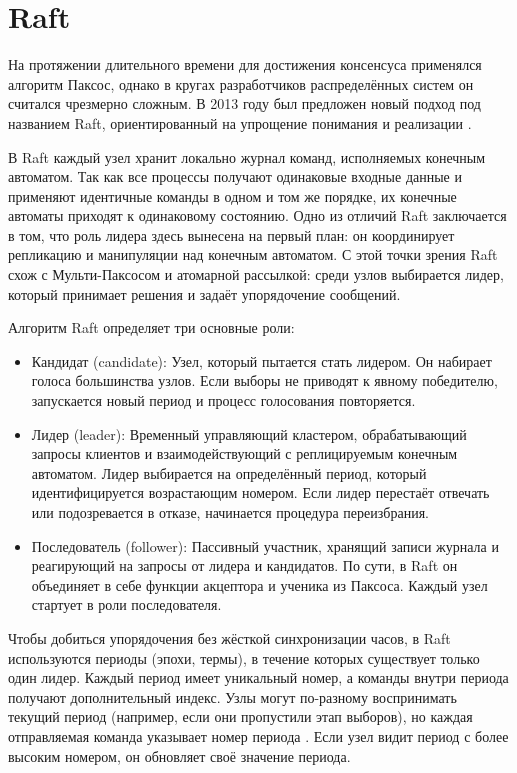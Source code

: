 \section{Raft}

На протяжении длительного времени для достижения консенсуса применялся алгоритм
Паксос, однако в кругах разработчиков распределённых систем он считался
чрезмерно сложным. В 2013 году был предложен новый подход под названием Raft,
ориентированный на упрощение понимания и реализации \cite{ongario14}.

В Raft каждый узел хранит локально журнал команд, исполняемых конечным автоматом.
Так как все процессы получают одинаковые входные данные и применяют идентичные
команды в одном и том же порядке, их конечные автоматы приходят к одинаковому
состоянию. Одно из отличий Raft заключается в том, что роль лидера здесь
вынесена на первый план: он координирует репликацию и манипуляции над конечным
автоматом. С этой точки зрения Raft схож с Мульти-Паксосом и атомарной рассылкой:
среди узлов выбирается лидер, который принимает решения и задаёт упорядочение
сообщений.

Алгоритм Raft определяет три основные роли:

\begin{itemize}
    \item Кандидат (candidate): Узел, который пытается стать лидером. Он набирает
        голоса большинства узлов. Если выборы не приводят к явному победителю,
        запускается новый период и процесс голосования повторяется.
    \item Лидер (leader): Временный управляющий кластером, обрабатывающий запросы
        клиентов и взаимодействующий с реплицируемым конечным автоматом. Лидер
        выбирается на определённый период, который идентифицируется возрастающим
        номером. Если лидер перестаёт отвечать или подозревается в отказе,
        начинается процедура переизбрания.
    \item Последователь (follower): Пассивный участник, хранящий записи журнала
        и реагирующий на запросы от лидера и кандидатов. По сути, в Raft он
        объединяет в себе функции акцептора и ученика из Паксоса. Каждый узел
        стартует в роли последователя.
\end{itemize}

Чтобы добиться упорядочения без жёсткой синхронизации часов, в Raft используются
периоды (эпохи, термы), в течение которых существует только один лидер. Каждый
период имеет уникальный номер, а команды внутри периода получают дополнительный
индекс. Узлы могут по-разному воспринимать текущий период (например, если они
пропустили этап выборов), но каждая отправляемая команда указывает номер
периода \cite{ongario14}. Если узел видит период с более высоким номером, он
обновляет своё значение периода.

